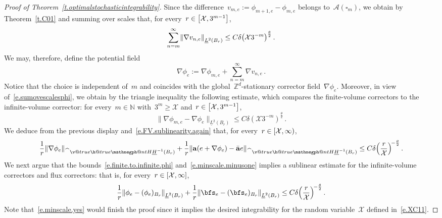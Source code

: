 \documentclass[11pt,twoside]{article} %
\makeatletter
\let\oldsquare\square %
\renewcommand{\square}{\oldsquare}
\numberwithin{equation}{section}
\theoremstyle{definition}
\let\originalleft\left
\let\originalright\right
\renewcommand{\left}{\mathopen{}\mathclose\bgroup\originalleft}
\renewcommand{\right}{\aftergroup\egroup\originalright}
\newcommand*{\N}{\ensuremath{\mathbb{N}}}
\newcommand*{\Zd}{\ensuremath{\mathbb{Z}^d}}
\renewcommand*{\hat}{\widehat}
\renewcommand{\a}{\mathbf{a}}
\newcommand{\ahom}{\bar{\a}}
\newcommand{\cu}{\square}
\newcommand{\X}{\mathcal{X}}
\newcommand{\negphantom}{\v@true\h@true\negph@nt}
\newcommand{\negph@nt}{\ifmmode\expandafter\mathpalette 
  \expandafter\mathnegph@nt\else\expandafter\makenegph@nt\fi}
\newcommand{\makenegph@nt}[1]{%
  \setbox\z@\hbox{\color@begingroup#1\color@endgroup}\finnegph@nt}
\newcommand{\finnegph@nt}{%
  \setbox\tw@\null 
  \ifv@ \ht\tw@\ht\z@\dp\tw@\dp\z@\fi \ifh@\wd\tw@-\wd\z@\fi\box\tw@}
\newcommand{\mathnegph@nt}[2]{%
  \setbox\z@\hbox{$\m@th #1{#2}$}\finnegph@nt}
\newcommand{\Hminusul}{\hat{\phantom{H}}\negphantom{H}\underline{H}^{-1}}
\newcommand{\A}{\mathcal{A}}
\makeatother
\begin{document}
\begin{proof}[Proof of Theorem~\ref{t.optimalstochasticintegrability}]
Since the difference~$v_{m,e} := \phi_{m+1,e}-\phi_{m,e}$ belongs to~$\A(\cu_m)$, we obtain by Theorem~\ref{t.C01} and summing over scales that, for every~$r \in \left[\X , 3^{m-1} \right]$, 
\begin{equation}
\label{e.sumovescalesphi}
\sum_{n = m}^\infty \left\| \nabla v_{n,e} \right\|_{\underline{L}^2(B_{r})} 
\leq
C \delta \bigl( \X 3^{-m} \bigr)^{\frac\theta2}
\,.
\end{equation}
We may, therefore, define the potential field
\begin{equation*} %
\nabla \phi_e := \nabla \phi_{m,e} + \sum_{n = m}^\infty \nabla v_{n,e} \,.
\end{equation*}
Notice that the choice is independent of~$m$ and coincides with the global~$\Zd$-stationary corrector field~$\nabla \phi_e$.
Moreover, in view of~\eqref{e.sumovescalesphi}, we obtain by the triangle inequality the following estimate, which compares the finite-volume correctors to the infinite-volume corrector: for every~$m\in\N$ with~$3^m\geq \X$ and~$r \in \left[\X, 3^{m-1} \right]$,
\begin{equation}
\label{e.finite.to.infinite.phi}
\| \nabla \phi_{m,e} - \nabla \phi_e \|_{\underline{L}^2(B_r)} 
\leq
C\delta ( \X 3^{-m} )^{\frac\theta2}\,.
\end{equation}
We deduce from the previous display and~\eqref{e.FV.sublinearity.again} that,
for every~$r \in \left[\X,\infty \right)$,
\begin{equation}
\label{e.minscale.minusone}
\frac1r \left\| \nabla \phi_e \right\|_{\Hminusul(B_{r})} 
+
\frac1r \left\| \a(e+ \nabla \phi_e) - \ahom e \right\|_{\Hminusul(B_{r})} \leq C\delta \Bigl( \frac{r}{\X}\Bigr)^{\!-\frac\theta2} 
\,.
\end{equation}
We next argue that the bounds~\eqref{e.finite.to.infinite.phi} and~\eqref{e.minscale.minusone} implies a sublinear estimate for the infinite-volume correctors and flux correctors: that is, for every~$r \in \left[\X,\infty \right]$,
\begin{equation}
\label{e.minscale.yes}
\frac1r \left\| \phi_e - (\phi_e)_{B_r} \right\|_{\underline{L}^2(B_{r})} 
+
\frac1r \left\| \bfs_e - (\bfs_e)_{B_r} \right\|_{\underline{L}^2(B_{r})} 
\leq 
C \delta \Bigl( \frac{r}{\X}\Bigr)^{\!-\frac\theta2} 
\,.
\end{equation}
Note that~\eqref{e.minscale.yes} would finish the proof since it implies the desired integrability for the random variable~$\X$ defined in~\eqref{e.XC11}.

\smallskip


\end{proof}
\end{document}
